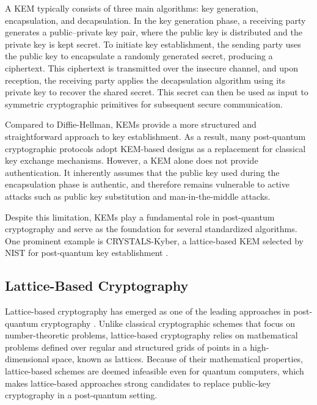 \documentclass[12pt]{article}
\begin{document}
A KEM typically consists of three main algorithms: key generation, encapsulation, and decapsulation. In the key generation phase, a receiving party generates a public--private key pair, where the public key is distributed and the private key is kept secret. To initiate key establishment, the sending party uses the public key to encapsulate a randomly generated secret, producing a ciphertext. This ciphertext is transmitted over the insecure channel, and upon reception, the receiving party applies the decapsulation algorithm using its private key to recover the shared secret. This secret can then be used as input to symmetric cryptographic primitives for subsequent secure communication.

Compared to Diffie-Hellman, KEMs provide a more structured and straightforward approach to key establishment. As a result, many post-quantum cryptographic protocols adopt KEM-based designs as a replacement for classical key exchange mechanisms. However, a KEM alone does not provide authentication. It inherently assumes that the public key used during the encapsulation phase is authentic, and therefore remains vulnerable to active attacks such as public key substitution and man-in-the-middle attacks.

Despite this limitation, KEMs play a fundamental role in post-quantum cryptography and serve as the foundation for several standardized algorithms. One prominent example is CRYSTALS-Kyber, a lattice-based KEM selected by NIST for post-quantum key establishment \cite{kyberspec,nist2024}.



\subsection{Lattice-Based Cryptography}

Lattice-based cryptography has emerged as one of the leading approaches in post-quantum cryptography  \cite{nist2024}. Unlike classical cryptographic schemes that focus on number-theoretic problems, lattice-based cryptography relies on mathematical problems defined over regular and structured grids of points in a high-dimensional space, known as lattices. Because of their mathematical properties, lattice-based schemes are deemed infeasible even for quantum computers, which makes lattice-based approaches strong candidates to replace public-key cryptography in a post-quantum setting.
\end{document}
